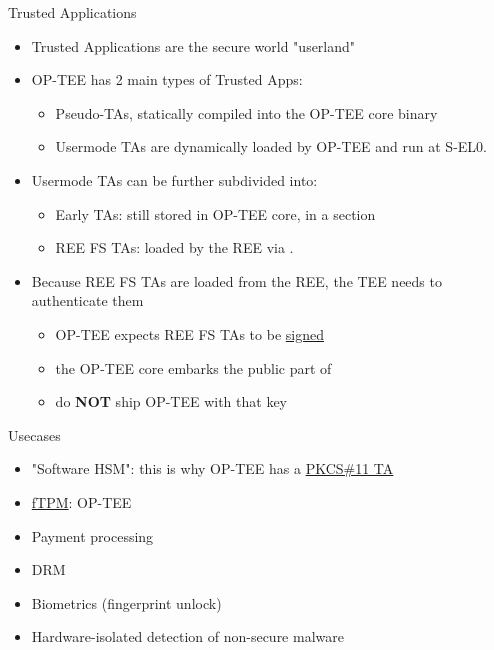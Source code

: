 \begin{frame}{Trusted Applications}
  \begin{itemize}
    \item Trusted Applications are the secure world "userland"
    \item OP-TEE has 2 main types of Trusted Apps:
    \begin{itemize}
      \item Pseudo-TAs, statically compiled into the OP-TEE core binary
      \item Usermode TAs are dynamically loaded by OP-TEE and run at S-EL0.\\
    \end{itemize}
    \item Usermode TAs can be further subdivided into:
    \begin{itemize}
      \item Early TAs: still stored in OP-TEE core, in a  section
      \item REE FS TAs: loaded by the REE via .
    \end{itemize}
    \item Because REE FS TAs are loaded from the REE, the TEE needs to authenticate them
    \begin{itemize}
      \item OP-TEE expects REE FS TAs to be \href{https://optee.readthedocs.io/en/latest/building/trusted_applications.html\#signing-of-tas}{signed}
      \item the OP-TEE core embarks the public part of
            \href{https://elixir.bootlin.com/op-tee/4.9.0/source/keys/default_ta.pem}{}
      \item do \textbf{NOT} ship OP-TEE with that key
    \end{itemize}
  \end{itemize}
\end{frame}

\begin{frame}{Usecases}
  \begin{itemize}
    \item "Software HSM": this is why OP-TEE has a \href{https://github.com/OP-TEE/optee_os/tree/master/ta/pkcs11}{PKCS\#11 TA}
    \item \href{https://github.com/OP-TEE/optee_ftpm}{fTPM}: OP-TEE 
    \item Payment processing
    \item DRM
    \item Biometrics (fingerprint unlock)
    \item Hardware-isolated detection of non-secure malware
  \end{itemize}
\end{frame}

